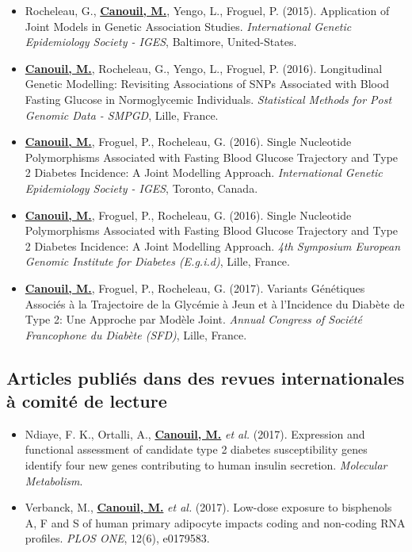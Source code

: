 \documentclass[11pt,a4paper,notrimn]{krantz}
\theoremstyle{definition}
\theoremstyle{definition}
\theoremstyle{remark}
\begin{document}
\begin{itemize}
\item Rocheleau, G., \underline{\textbf{Canouil, M.}}, Yengo, L., Froguel, P. (2015). Application of Joint Models in Genetic Association Studies. \textit{International Genetic Epidemiology Society - IGES}, Baltimore, United-States.

\item \underline{\textbf{Canouil, M.}}, Rocheleau, G., Yengo, L., Froguel, P. (2016). Longitudinal Genetic Modelling: Revisiting Associations of SNPs Associated with Blood Fasting Glucose in Normoglycemic Individuals. \textit{Statistical Methods for Post Genomic Data - SMPGD}, Lille, France.

\item \underline{\textbf{Canouil, M.}}, Froguel, P., Rocheleau, G. (2016). Single Nucleotide Polymorphisms Associated with Fasting Blood Glucose Trajectory and Type 2 Diabetes Incidence: A Joint Modelling Approach. \textit{International Genetic Epidemiology Society - IGES}, Toronto, Canada.

\item \underline{\textbf{Canouil, M.}}, Froguel, P., Rocheleau, G. (2016). Single Nucleotide Polymorphisms Associated with Fasting Blood Glucose Trajectory and Type 2 Diabetes Incidence: A Joint Modelling Approach. \textit{4th Symposium European Genomic Institute for Diabetes (E.g.i.d)}, Lille, France.

\item \underline{\textbf{Canouil, M.}}, Froguel, P., Rocheleau, G. (2017). Variants Génétiques Associés à la Trajectoire de la Glycémie à Jeun et à l’Incidence du Diabète de Type 2: Une Approche par Modèle Joint. \textit{Annual Congress of Société Francophone du Diabète (SFD)}, Lille, France. 
\end{itemize}

\clearpage

\subsection{Articles publiés dans des revues internationales à comité de
lecture}\label{articles-publies-dans-des-revues-internationales-a-comite-de-lecture}

\begin{itemize}
\item Ndiaye, F. K., Ortalli, A., \underline{\textbf{Canouil, M.}} \textit{et al.} (2017). Expression and functional assessment of candidate type 2 diabetes susceptibility genes identify four new genes contributing to human insulin secretion. \textit{Molecular Metabolism}.

\item Verbanck, M., \underline{\textbf{Canouil, M.}} \textit{et al.} (2017). Low-dose exposure to bisphenols A, F and S of human primary adipocyte impacts coding and non-coding RNA profiles. \textit{PLOS ONE}, 12(6), e0179583.
\end{itemize}
\end{document}
